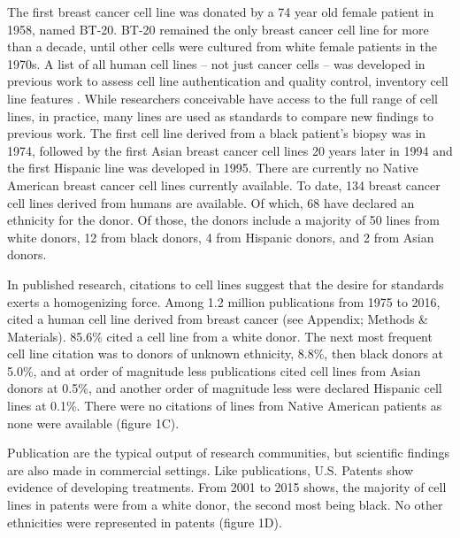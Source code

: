 \documentclass[10pt]{article}
\begin{document}
\begin{multicols}{2}
The first breast cancer cell line was donated by a 74 year old female patient in 1958, named BT-20. BT-20 remained the only breast cancer cell line for more than a decade, until other cells were cultured from white female patients in the 1970s. A list of all human cell lines -- not just cancer cells -- was developed in previous work to assess cell line authentication and quality control, inventory cell line features \cite{yu2015resource}. While researchers conceivable have access to the full range of cell lines, in practice, many lines are used as standards to compare new findings to previous work. The first cell line derived from a black patient's biopsy was in 1974, followed by the first Asian breast cancer cell lines 20 years later in 1994 and the first Hispanic line was developed in 1995. There are currently no Native American breast cancer cell lines currently available. To date, 134 breast cancer cell lines derived from humans are available. Of which, 68 have declared an ethnicity for the donor. Of those, the donors include a majority of 50 lines from white donors, 12 from black donors, 4 from Hispanic donors, and 2 from Asian donors. %

In published research, citations to cell lines suggest that the desire for standards exerts a homogenizing force. Among 1.2 million publications from 1975 to 2016, cited a human cell line derived from breast cancer (see Appendix; Methods \& Materials). 85.6\% cited a cell line from a white donor. The next most frequent cell line citation was to donors of unknown ethnicity, 8.8\%, then black donors at 5.0\%, and at order of magnitude less publications cited cell lines from Asian donors at 0.5\%, and another order of magnitude less were declared Hispanic cell lines at 0.1\%. There were no citations of lines from Native American patients as none were available (figure 1C).

Publication are the typical output of research communities, but scientific findings are also made in commercial settings. Like publications, U.S. Patents show evidence of developing treatments. From 2001 to 2015 shows, the majority of cell lines in patents were from a white donor, the second most being black. No other ethnicities were represented in patents (figure 1D).


\end{multicols}
\end{document}
